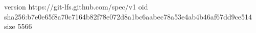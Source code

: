 version https://git-lfs.github.com/spec/v1
oid sha256:b7e0e65f8a70c7164b82f78e072d8a1bc6aabec78a53e4ab4b46af67dd9ce514
size 5566
